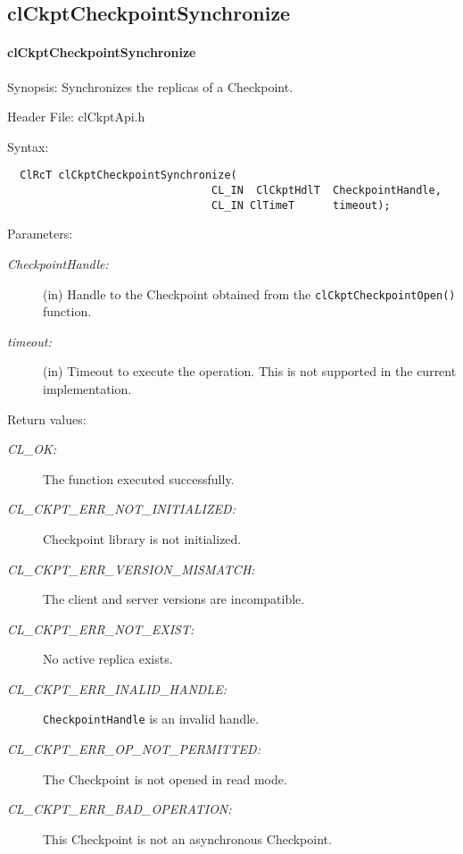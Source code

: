 \begin{flushleft}
\subsection{clCkptCheckpointSynchronize}
\hypertarget{pageckpt119}{}\paragraph{cl\-Ckpt\-Checkpoint\-Synchronize}\label{pageckpt119}
\begin{Desc}
\item[Synopsis:]Synchronizes the replicas of a Checkpoint.\end{Desc}
\begin{Desc}
\item[Header File:]clCkptApi.h\end{Desc}
\begin{Desc}
\item[Syntax:]

\footnotesize\begin{verbatim}  ClRcT clCkptCheckpointSynchronize(
                     			CL_IN  ClCkptHdlT  CheckpointHandle,
                     			CL_IN ClTimeT      timeout);
\end{verbatim}
\normalsize
\end{Desc}
\begin{Desc}
\item[Parameters:]
\begin{description}
\item[{\em Checkpoint\-Handle:}](in) Handle to the Checkpoint obtained from the {\tt{cl\-Ckpt\-Checkpoint\-Open()}} function. 
\item[{\em timeout:}](in) Timeout to execute the operation. This is not supported in the current implementation.\end{description}
\end{Desc}
\begin{Desc}
\item[Return values:]
\begin{description}
\item[{\em CL\_\-OK:}]The function executed successfully. 
\item[{\em CL\_\-CKPT\_\-ERR\_\-NOT\_\-INITIALIZED:}]Checkpoint library is not initialized. 
\item[{\em CL\_\-CKPT\_\-ERR\_\-VERSION\_\-MISMATCH:}]The client and server versions are incompatible.
\item[{\em CL\_\-CKPT\_\-ERR\_\-NOT\_\-EXIST:}] No active replica exists.
\item[{\em CL\_\-CKPT\_\-ERR\_\-INALID\_\-HANDLE:}]{\tt{CheckpointHandle}} is an invalid handle.
\item[{\em CL\_\-CKPT\_\-ERR\_\-OP\_\-NOT\_\-PERMITTED:}] The Checkpoint is not opened in read mode.
\item[{\em CL\_\-CKPT\_\-ERR\_\-BAD\_\-OPERATION:}]This Checkpoint is not an asynchronous Checkpoint.


\end{description}
\end{Desc}
\end{flushleft}
